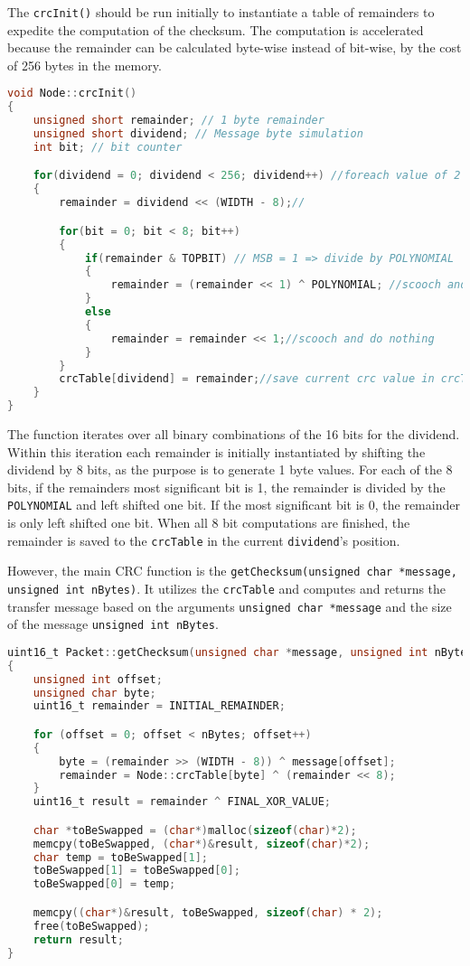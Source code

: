 The \texttt{crcInit()} should be run initially to instantiate a table of remainders to expedite the computation of the checksum. The computation is accelerated because the remainder can be calculated byte-wise instead of bit-wise, by the cost of 256 bytes in the memory.  

\begin{lstlisting}[language=C]
void Node::crcInit()
{
    unsigned short remainder; // 1 byte remainder
    unsigned short dividend; // Message byte simulation
    int bit; // bit counter

    for(dividend = 0; dividend < 256; dividend++) //foreach value of 2 bytes/8 bits
    { 
        remainder = dividend << (WIDTH - 8);//

        for(bit = 0; bit < 8; bit++)
        {
            if(remainder & TOPBIT) // MSB = 1 => divide by POLYNOMIAL
            { 
                remainder = (remainder << 1) ^ POLYNOMIAL; //scooch and divide
            }
            else
            {
                remainder = remainder << 1;//scooch and do nothing
            }
        }
        crcTable[dividend] = remainder;//save current crc value in crcTable
    }
}
\end{lstlisting}

The function iterates over all binary combinations of the 16 bits for the dividend. Within this iteration each remainder is initially instantiated by shifting the dividend by 8 bits, as the purpose is to generate 1 byte values. For each of the 8 bits, if the remainders most significant bit is 1, the remainder is divided by the \texttt{POLYNOMIAL} and left shifted one bit. If the most significant bit is 0, the remainder is only left shifted one bit. When all 8 bit computations are finished, the remainder is saved to the \texttt{crcTable} in the current \texttt{dividend}'s position.

However, the main CRC function is the \texttt{getChecksum(unsigned char *message, unsigned int nBytes)}. It utilizes the \texttt{crcTable} and computes and returns the transfer message based on the arguments \texttt{unsigned char *message} and the size of the message \texttt{unsigned int nBytes}.

\begin{lstlisting}[language=C]
uint16_t Packet::getChecksum(unsigned char *message, unsigned int nBytes)
{
    unsigned int offset;
    unsigned char byte;
    uint16_t remainder = INITIAL_REMAINDER;

    for (offset = 0; offset < nBytes; offset++)
    {
        byte = (remainder >> (WIDTH - 8)) ^ message[offset];
        remainder = Node::crcTable[byte] ^ (remainder << 8);
    }
    uint16_t result = remainder ^ FINAL_XOR_VALUE;

    char *toBeSwapped = (char*)malloc(sizeof(char)*2);
    memcpy(toBeSwapped, (char*)&result, sizeof(char)*2);
    char temp = toBeSwapped[1];
    toBeSwapped[1] = toBeSwapped[0];
    toBeSwapped[0] = temp;

    memcpy((char*)&result, toBeSwapped, sizeof(char) * 2);
    free(toBeSwapped);
    return result;
}
\end{lstlisting}


